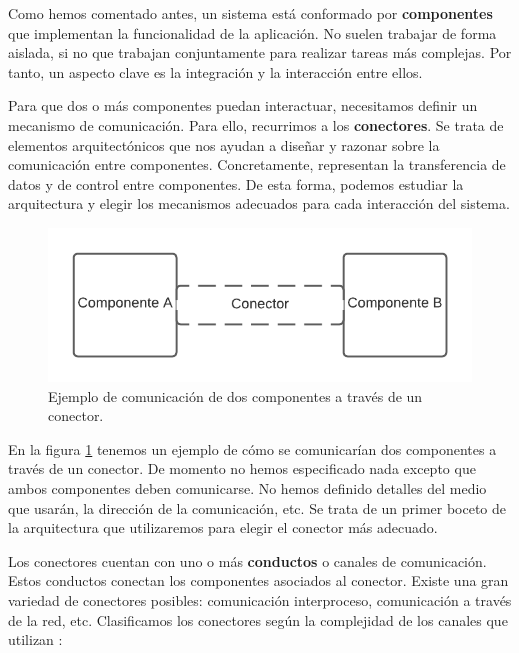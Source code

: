 Como hemos comentado antes, un sistema está conformado por \textbf{componentes} que implementan la funcionalidad de la aplicación. No suelen trabajar de forma aislada, si no que trabajan conjuntamente para realizar tareas más complejas. Por tanto, un aspecto clave es la integración y la interacción entre ellos. \cite{mehtaTaxonomySoftwareConnectors2000}

Para que dos o más componentes puedan interactuar, necesitamos definir un mecanismo de comunicación. Para ello, recurrimos a los \textbf{conectores}. Se trata de elementos arquitectónicos que nos ayudan a diseñar y razonar sobre la comunicación entre componentes. Concretamente, representan la transferencia de datos y de control entre componentes. De esta forma, podemos estudiar la arquitectura y elegir los mecanismos adecuados para cada interacción del sistema. \cite{taylorSoftwareArchitectureFoundations2009}

\begin{figure}[h]
  \centering
  \includegraphics{service_connectors/images/conector}
  \caption{Ejemplo de comunicación de dos componentes a través de un conector.}
  \label{fig:componentesEjemplo}
\end{figure}

En la figura \ref{fig:componentesEjemplo} tenemos un ejemplo de cómo se comunicarían dos componentes a través de un conector. De momento no hemos especificado nada excepto que ambos componentes deben comunicarse. No hemos definido detalles del medio que usarán, la dirección de la comunicación, etc. Se trata de un primer boceto de la arquitectura que utilizaremos para elegir el conector más adecuado.

Los conectores cuentan con uno o más \textbf{conductos} o canales de comunicación. Estos conductos conectan los componentes asociados al conector. Existe una gran variedad de conectores posibles: comunicación interproceso, comunicación a través de la red, etc. Clasificamos los conectores según la complejidad de los canales que utilizan \cite{mehtaTaxonomySoftwareConnectors2000}:

